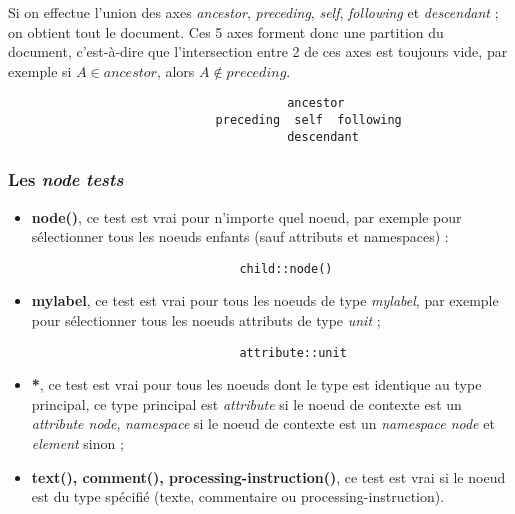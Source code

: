 \documentclass{article}
\begin{document}
Si on effectue l'union des axes \textit{ancestor}, \textit{preceding}, \textit{self}, \textit{following} et \textit{descendant} ; on obtient tout le document. Ces 5 axes forment 
donc une partition du document, c'est-à-dire que l'intersection entre 2 de ces axes est toujours vide, par exemple si $A\in ancestor$, alors $A\not\in preceding$.
\begin{verbatim}
                                       ancestor
                             preceding  self  following
                                       descendant
\end{verbatim}

\subsubsection{Les \textit{node tests}}
\begin{itemize}
\item \textbf{node()}, ce test est vrai pour n'importe quel noeud, par exemple pour sélectionner tous les noeuds enfants (sauf attributs et namespaces) :
\begin{verbatim}
                             child::node()
\end{verbatim}
\item \textbf{mylabel}, ce test est vrai pour tous les noeuds de type \textit{mylabel}, par exemple pour sélectionner tous les noeuds attributs de type \textit{unit} ;
\begin{verbatim}
                             attribute::unit
\end{verbatim}
\item \textbf{*}, ce test est vrai pour tous les noeuds dont le type est identique au type principal, ce type principal est \textit{attribute} si le noeud de contexte est un 
\textit{attribute node}, \textit{namespace} si le noeud de contexte est un \textit{namespace node} et \textit{element} sinon ;
\item \textbf{text(), comment(), processing-instruction()}, ce test est vrai si le noeud est du type spécifié (texte, commentaire ou processing-instruction).
\end{itemize}
\end{document}
